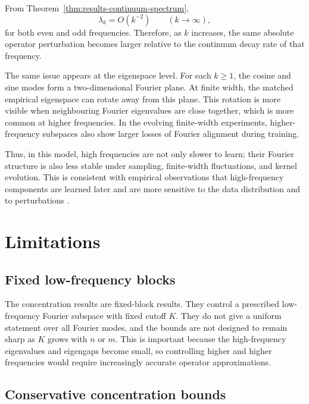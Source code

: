 From Theorem~\ref{thm:results-continuum-spectrum},
\[
	\lambda_k = O(k^{-2})
	\qquad (k\to\infty),
\]
for both even and odd frequencies. Therefore, as \(k\) increases, the same
absolute operator perturbation becomes larger relative to the continuum decay
rate of that frequency.

The same issue appears at the eigenspace level. For each \(k\ge 1\), the cosine
and sine modes form a two-dimensional Fourier plane. At finite width, the
matched empirical eigenspace can rotate away from this plane. This rotation is
more visible when neighbouring Fourier eigenvalues are close together, which is
more common at higher frequencies. In the evolving finite-width experiments,
higher-frequency subspaces also show larger losses of Fourier alignment during
training.

Thus, in this model, high frequencies are not only slower to learn; their
Fourier structure is also less stable under sampling, finite-width fluctuations,
and kernel evolution. This is consistent with empirical observations that
high-frequency components are learned later and are more sensitive to the data
distribution and to perturbations
\citep{rahaman2019spectralbiasneuralnetworks,basri2019convergence,basri2020frequencybiasneuralnetworks}.

\section{Limitations}
\label{sec:discussion-limitations}

\subsection{Fixed low-frequency blocks}
\label{subsec:discussion-limitations-fixed-block}

The concentration results are fixed-block results. They control a prescribed
low-frequency Fourier subspace with fixed cutoff \(K\). They do not give a
uniform statement over all Fourier modes, and the bounds are not designed to
remain sharp as \(K\) grows with \(n\) or \(m\). This is important because the
high-frequency eigenvalues and eigengaps become small, so controlling higher
and higher frequencies would require increasingly accurate operator
approximations.

\subsection{Conservative concentration bounds}
\label{subsec:discussion-limitations-concentration}

